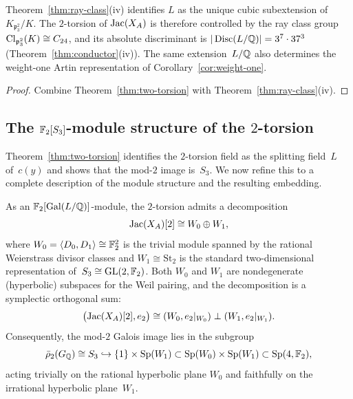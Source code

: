 \begin{corollary}\label{cor:two-torsion-classfield}
Theorem~\ref{thm:ray-class}(iv) identifies \(L\) as the unique cubic subextension of \(K_{\mathfrak p_3^2}/K\). The \(2\)-torsion of \(\operatorname{Jac}(X_A)\) is therefore controlled by the ray class group \(\operatorname{Cl}_{\mathfrak p_3^2}(K)\cong C_{24}\), and its absolute discriminant is \(|\operatorname{Disc}(L/\mathbb{Q})|=3^7\cdot 37^3\) (Theorem~\ref{thm:conductor}(iv)). The same extension~\(L/\mathbb{Q}\) also determines the weight-one Artin representation of Corollary~\ref{cor:weight-one}.
\end{corollary}

\begin{proof}
Combine Theorem~\ref{thm:two-torsion} with Theorem~\ref{thm:ray-class}(iv).
\end{proof}

\subsection{The \texorpdfstring{$\mathbb{F}_2[S_3]$}{F2[S3]}-module structure of the \texorpdfstring{$2$}{2}-torsion}

Theorem~\ref{thm:two-torsion} identifies the \(2\)-torsion field as the splitting field~\(L\) of~\(c(y)\) and shows that the mod-\(2\) image is~\(S_3\). We now refine this to a complete description of the module structure and the resulting embedding.

\begin{theorem}\label{thm:mod2-structure}
As an \(\mathbb{F}_2[\operatorname{Gal}(L/\mathbb{Q})]\)-module, the \(2\)-torsion admits a decomposition
\[
\operatorname{Jac}(X_A)[2]\cong W_0\oplus W_1,
\]
where \(W_0=\langle D_0,D_1\rangle\cong \mathbb{F}_2^2\) is the trivial module spanned by the rational Weierstrass divisor classes and \(W_1\cong \mathrm{St}_2\) is the standard two-dimensional representation of~\(S_3\cong \mathrm{GL}(2,\mathbb{F}_2)\). Both \(W_0\) and \(W_1\) are nondegenerate (hyperbolic) subspaces for the Weil pairing, and the decomposition is a symplectic orthogonal sum:
\[
\bigl(\operatorname{Jac}(X_A)[2],e_2\bigr)\cong (W_0,e_2|_{W_0})\perp (W_1,e_2|_{W_1}).
\]
Consequently, the mod-\(2\) Galois image lies in the subgroup
\[
\bar\rho_2(G_{\mathbb{Q}})\cong S_3\hookrightarrow \{1\}\times \mathrm{Sp}(W_1)\subset \mathrm{Sp}(W_0)\times \mathrm{Sp}(W_1)\subset \mathrm{Sp}(4,\mathbb{F}_2),
\]
acting trivially on the rational hyperbolic plane \(W_0\) and faithfully on the irrational hyperbolic plane~\(W_1\).
\end{theorem}

